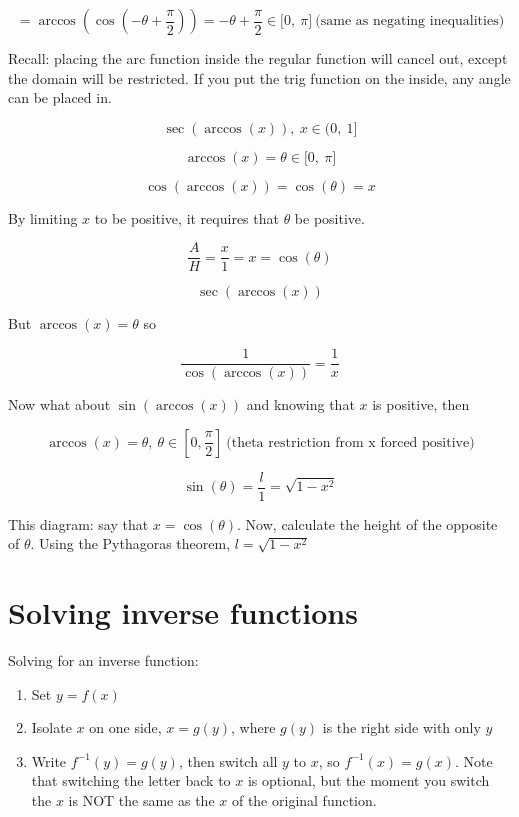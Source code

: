 \documentclass[12pt]{article}
\theoremstyle{plain}
\theoremstyle{remark}
\theoremstyle{definition}
\begin{document}
\[= \arccos\left( \cos\left( - \theta + \frac{\pi}{2} \right) \right) = - \theta + \frac{\pi}{2} \in \lbrack 0,\ \pi\rbrack\ \text{(same\ as\ negating\ inequalities)}\]

Recall: placing the arc function inside the regular function will cancel
out, except the domain will be restricted. If you put the trig function
on the inside, any angle can be placed in.

\[\sec\left( \arccos(x) \right),\ x \in (0,\ 1\rbrack\]

\[\arccos(x) = \theta \in \lbrack 0,\ \pi\rbrack\]

\[\cos\left( \arccos(x) \right) = \cos(\theta) = x\]

By limiting \(x\) to be positive, it requires that \(\theta\) be
positive.

\[\frac{A}{H} = \frac{x}{1} = x = \cos(\theta)
\]

\[\sec\left( \arccos(x) \right)\]

But \(\arccos(x) = \theta\) so

\[\frac{1}{\cos\left( \arccos(x) \right)} = \frac{1}{x}\]

Now what about \(\sin\left( \arccos(x) \right)\) and knowing that \(x\)
is positive, then

\[\arccos(x) = \theta,\ \theta \in \left\lbrack 0,\frac{\pi}{2} \right\rbrack\ \text{(theta\ restriction\ from\ x\ forced\ positive)}\]

\[\sin(\theta) = \frac{l}{1} = \sqrt{1 - x^{2}}\]

This diagram: say that \(x = \cos(\theta)\). Now, calculate the height
of the opposite of \(\theta\). Using the Pythagoras theorem,
\(l = \sqrt{1 - x^{2}}\)


\section{Solving inverse functions}

Solving for an inverse function:

\begin{enumerate}
\def\labelenumi{\arabic{enumi}.}
\item
  Set \(y = f(x)\)
\item
  Isolate \(x\) on one side, \(x = g(y)\), where \(g(y)\) is the right
  side with only \(y\)
\item
  Write \(f^{- 1}(y) = g(y)\), then switch all \(y\) to \(x\), so
  \(f^{- 1}(x) = g(x)\). Note that switching the letter back to \(x\) is
  optional, but the moment you switch the \(x\) is NOT the same as the
  \(x\) of the original function.
\end{enumerate}
\end{document}
